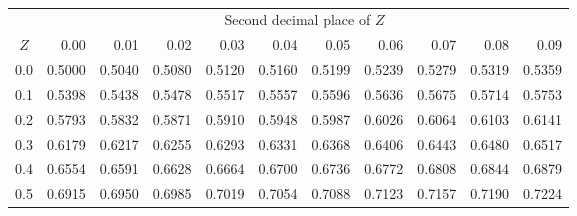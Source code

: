 \begin{table}[p]
\begin{center}{\small
{} \vspace{2mm} \\
\begin{tabular}{c | rrrrr | rrrrr |}
  \cline{2-11}
&&&& \multicolumn{4}{c}{Second decimal place of $Z$} &&& \\
  \cline{2-11}
$Z$ & 0.00 & 0.01 & 0.02 & 0.03 & 0.04 & 0.05 & 0.06 & 0.07 & 0.08 & 0.09 \\
  \hline
  \hline
0.0 & \footnotesize{0.5000} & \footnotesize{0.5040} & \footnotesize{0.5080} & \footnotesize{0.5120} & \footnotesize{0.5160} & \footnotesize{0.5199} & \footnotesize{0.5239} & \footnotesize{0.5279} & \footnotesize{0.5319} & \footnotesize{0.5359} \\
  0.1 & \footnotesize{0.5398} & \footnotesize{0.5438} & \footnotesize{0.5478} & \footnotesize{0.5517} & \footnotesize{0.5557} & \footnotesize{0.5596} & \footnotesize{0.5636} & \footnotesize{0.5675} & \footnotesize{0.5714} & \footnotesize{0.5753} \\
  0.2 & \footnotesize{0.5793} & \footnotesize{0.5832} & \footnotesize{0.5871} & \footnotesize{0.5910} & \footnotesize{0.5948} & \footnotesize{0.5987} & \footnotesize{0.6026} & \footnotesize{0.6064} & \footnotesize{0.6103} & \footnotesize{0.6141} \\
  0.3 & \footnotesize{0.6179} & \footnotesize{0.6217} & \footnotesize{0.6255} & \footnotesize{0.6293} & \footnotesize{0.6331} & \footnotesize{0.6368} & \footnotesize{0.6406} & \footnotesize{0.6443} & \footnotesize{0.6480} & \footnotesize{0.6517} \\
  0.4 & \footnotesize{0.6554} & \footnotesize{0.6591} & \footnotesize{0.6628} & \footnotesize{0.6664} & \footnotesize{0.6700} & \footnotesize{0.6736} & \footnotesize{0.6772} & \footnotesize{0.6808} & \footnotesize{0.6844} & \footnotesize{0.6879} \\
  \hline
  0.5 & \footnotesize{0.6915} & \footnotesize{0.6950} & \footnotesize{0.6985} & \footnotesize{0.7019} & \footnotesize{0.7054} & \footnotesize{0.7088} & \footnotesize{0.7123} & \footnotesize{0.7157} & \footnotesize{0.7190} & \footnotesize{0.7224} \\

\end{tabular}}
\end{center}
\end{table}
